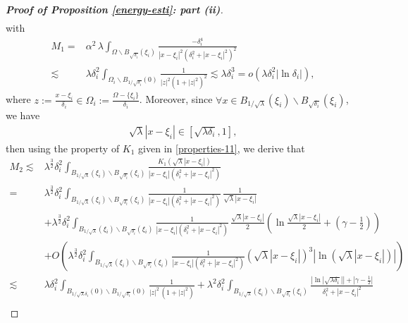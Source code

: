\documentclass[a4paper,reqno,11pt,oneside]{amsart}
\numberwithin{equation}{section}
\begin{document}
\begin{proof}[\textbf{Proof of Proposition \eqref{energy-esti}: part (ii)}]
\begin{align*}
\end{align*}
with
\begin{align*}
     M_1=&\alpha^2\,{\lambda}\displaystyle\int_{\Omega\backslash B_{\sqrt{\delta_i}}(\xi_i)}\frac{-\delta_i^4}{|x-\xi_i|^2\left(\delta_i^2+|x-\xi_i|^2\right)^2}\\
     \lesssim&\lambda\delta_i^2\displaystyle\int_{\Omega_i\backslash B_{1/\sqrt{\delta_i}}(0)}\frac{1}{|z|^2\left(1+|z|^2\right)^2}\lesssim\lambda\delta_i^3=o\left(\lambda\delta_i^2|\ln{\delta_i}|\right),
\end{align*}
where $z:=\frac{x-\xi_i}{\delta_i}\in \Omega_i:=\frac{\Omega-\{\xi_i\}}{\delta_i}$. Moreover, since $\forall x\in B_{1/\sqrt{\lambda}}(\xi_i)\backslash B_{\sqrt{\delta_i}}(\xi_i)$, we have
\begin{align*}
    \sqrt{\lambda}|x-\xi_i|\in\left[\sqrt{\lambda\delta_i},1\right],
\end{align*}
then using the property of $K_1$ given in \eqref{properties-11}, we derive that
\begin{align*}
    M_2\lesssim&\lambda^{\frac{3}{2}}\delta_i^2\displaystyle\int_{B_{1/\sqrt{\lambda}}(\xi_i)\backslash B_{\sqrt{\delta_i}}(\xi_i)}\frac{ K_{1}(\sqrt{\lambda}|x-\xi_i|)}{|x-\xi_i|\left(\delta_i^2+|x-\xi_i|^2\right)}\\
    =&\lambda^{\frac{3}{2}}\delta_i^2\displaystyle\int_{B_{1/\sqrt{\lambda}}(\xi_i)\backslash B_{\sqrt{\delta_i}}(\xi_i)}\frac{1}{|x-\xi_i|\!\left(\delta_i^2+|x-\xi_i|^2\right)}\,\frac{1}{\sqrt{\lambda}|x-\xi_i|}\\&+\lambda^{\frac{3}{2}}\delta_i^{2}\displaystyle\int_{B_{1/\sqrt{\lambda}}(\xi_i)\backslash B_{\sqrt{\delta_i}}(\xi_i)}\frac{1}{|x-\xi_i|\!\left(\delta_i^2+|x-\xi_i|^2\right)}\,\frac{\sqrt{\lambda}|x-\xi_i|}{2}\left(\ln\frac{\sqrt{\lambda}|x-\xi_i|}{2}\!+\!\left(\!\gamma-\frac{1}{2}\!\right)\!\right)\\
    &+O\left(\lambda^{\frac{3}{2}}\delta_i^2\displaystyle\int_{B_{1/\sqrt{\lambda}}(\xi_i)\backslash B_{\sqrt{\delta_i}}(\xi_i)}\frac{1}{|x-\xi_i|\!\left(\delta_i^2+|x-\xi_i|^2\right)}\left(\sqrt{\lambda}|x-\xi_i|\right)^3\left|\ln (\sqrt{\lambda}|x-\xi_i|)\right|\right)\\
    \lesssim&\lambda\delta_i^2\displaystyle\int_{B_{1/\sqrt{\lambda}\delta_i}(0)\backslash B_{1/\sqrt{\delta_i}}(0)}\frac{1}{|z|^2\,(1+|z|^2)}+\lambda^{{2}}\delta_i^{2}\displaystyle\int_{B_{1/\sqrt{\lambda}}(\xi_i)\backslash B_{\sqrt{\delta_i}}(\xi_i)}\frac{\left|\ln|\sqrt{\lambda\delta_i}|\right|+\left|\gamma-\frac{1}{2}\right|}{\delta_i^2+|x-\xi_i|^2}\\

\end{align*}
\end{proof}
\end{document}
